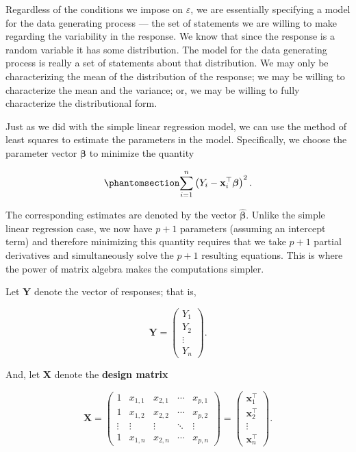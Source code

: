 \documentclass[
  letterpaper,
  DIV=11,
  numbers=noendperiod]{scrreprt}
\theoremstyle{definition}
\theoremstyle{plain}
\theoremstyle{definition}
\theoremstyle{remark}
\begin{document}
Regardless of the conditions we impose on \(\varepsilon\), we are
essentially specifying a model for the data generating process --- the
set of statements we are willing to make regarding the variability in
the response. We know that since the response is a random variable it
has some distribution. The model for the data generating process is
really a set of statements about that distribution. We may only be
characterizing the mean of the distribution of the response; we may be
willing to characterize the mean and the variance; or, we may be willing
to fully characterize the distributional form.

Just as we did with the simple linear regression model, we can use the
method of least squares to estimate the parameters in the model.
Specifically, we choose the parameter vector \(\boldsymbol{\beta}\) to
minimize the quantity

\begin{equation}\phantomsection\label{eq-lsq}{\sum_{i=1}^{n} \left(Y_i - \mathbf{x}_i^\top \boldsymbol{\beta}\right)^2.}\end{equation}

The corresponding estimates are denoted by the vector
\(\widehat{\boldsymbol{\beta}}.\) Unlike the simple linear regression
case, we now have \(p + 1\) parameters (assuming an intercept term) and
therefore minimizing this quantity requires that we take \(p + 1\)
partial derivatives and simultaneously solve the \(p + 1\) resulting
equations. This is where the power of matrix algebra makes the
computations simpler.

Let \(\mathbf{Y}\) denote the vector of responses; that is,

\[\mathbf{Y} = \begin{pmatrix} Y_1 \\ Y_2 \\ \vdots \\ Y_n \end{pmatrix}.\]

And, let \(\mathbf{X}\) denote the \textbf{design matrix}

\[\mathbf{X} = \begin{pmatrix} 1 & x_{1,1} & x_{2,1} & \dotsb & x_{p, 1} \\
1 & x_{1, 2} & x_{2, 2} & \dotsb & x_{p, 2} \\
\vdots & \vdots & \vdots & \ddots & \vdots \\
1 & x_{1, n} & x_{2, n} & \dotsb & x_{p, n} \end{pmatrix} = \begin{pmatrix} \mathbf{x}_1^\top \\ \mathbf{x}_2^\top \\ \vdots \\ \mathbf{x}_n^\top \end{pmatrix}.\]
\end{document}
